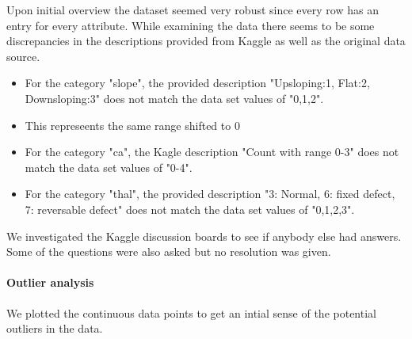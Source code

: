 \documentclass[11pt]{article}
\providecommand{\tightlist}{%
      \setlength{\itemsep}{0pt}\setlength{\parskip}{0pt}}
\begin{document}
Upon initial overview the dataset seemed very robust since every row has
an entry for every attribute. While examining the data there seems to be
some discrepancies in the descriptions provided from Kaggle as well as
the original data source.

\begin{itemize}
\tightlist
\item
  For the category "slope", the provided description "Upsloping:1,
  Flat:2, Downsloping:3" does not match the data set values of "0,1,2".
\item
  This represeents the same range shifted to 0
\item
  For the category "ca", the Kagle description "Count with range 0-3"
  does not match the data set values of "0-4".
\item
  For the category "thal", the provided description "3: Normal, 6: fixed
  defect, 7: reversable defect" does not match the data set values of
  "0,1,2,3".
\end{itemize}

We investigated the Kaggle discussion boards to see if anybody else had
answers. Some of the questions were also asked but no resolution was
given.

    \paragraph{Outlier analysis}\label{outlier-analysis}

We plotted the continuous data points to get an intial sense of the
potential outliers in the data.
\end{document}
